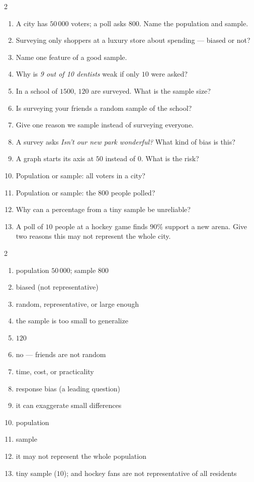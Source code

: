 \documentclass[11pt]{article}
\begin{document}
\begin{recapbox}
\begin{multicols}{2}
\small
\begin{enumerate}[leftmargin=*,itemsep=3pt]
  \item A city has $50\,000$ voters; a poll asks $800$. Name the population and sample.
  \item Surveying only shoppers at a luxury store about spending — biased or not?
  \item Name one feature of a good sample.
  \item Why is \emph{9 out of 10 dentists} weak if only $10$ were asked?
  \item In a school of $1500$, $120$ are surveyed. What is the sample size?
  \item Is surveying your friends a random sample of the school?
  \item Give one reason we sample instead of surveying everyone.
  \item A survey asks \emph{Isn't our new park wonderful?} What kind of bias is this?
  \item A graph starts its axis at $50$ instead of $0$. What is the risk?
  \item Population or sample: all voters in a city?
  \item Population or sample: the $800$ people polled?
  \item Why can a percentage from a tiny sample be unreliable?
  \item A poll of $10$ people at a hockey game finds $90\%$ support a new arena. Give two reasons this may not represent the whole city.
\end{enumerate}
\end{multicols}
\end{recapbox}

\begin{keybox}
\begin{multicols}{2}
\small
\begin{enumerate}[leftmargin=*,itemsep=3pt]
  \item population $50\,000$; sample $800$
  \item biased (not representative)
  \item random, representative, or large enough
  \item the sample is too small to generalize
  \item $120$
  \item no — friends are not random
  \item time, cost, or practicality
  \item response bias (a leading question)
  \item it can exaggerate small differences
  \item population
  \item sample
  \item it may not represent the whole population
  \item tiny sample ($10$); and hockey fans are not representative of all residents
\end{enumerate}
\end{multicols}
\end{keybox}
\end{document}
